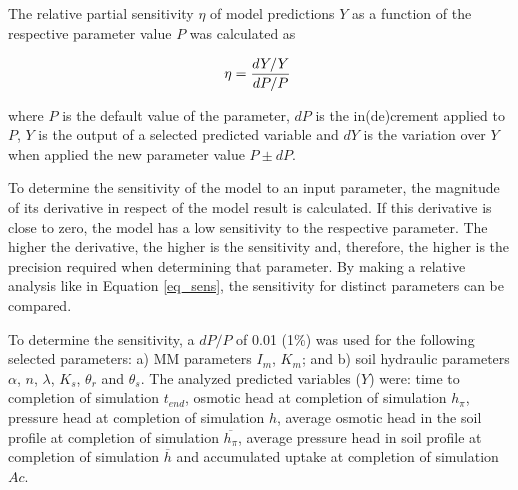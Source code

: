 The relative partial sensitivity $\eta$ \citep{quirijn_sens} of model predictions 
$Y$ as a function of the respective parameter value $P$ was calculated as

\begin{equation}
\label{eq_sens}
\eta = {dY/Y \over dP/P}\; 
\end{equation}

\noindent
where $P$ is the default value of the parameter, $dP$ is the in(de)crement applied to $P$, $Y$ is the output of a selected predicted variable and $dY$ is the variation over $Y$ when applied the new parameter value $P \pm dP$.

To determine the sensitivity of the model to an input parameter, the magnitude of its derivative in respect of the model result is calculated. 
If this derivative is close to zero, the model has a low sensitivity to the respective parameter. 
The higher the derivative, the higher is the sensitivity and, therefore, the higher is the precision required when determining that parameter. 
By making a relative analysis like in Equation \ref{eq_sens}, the sensitivity for distinct parameters can be compared. 

To determine the sensitivity, a $dP/P$ of 0.01 (1\%) was used for the following selected parameters: 
a) MM parameters $I_m$, $K_m$; and  
b) soil hydraulic parameters $\alpha$, $n$, $\lambda$, $K_s$, $\theta_r$ and $\theta_s$.
The analyzed predicted variables ($Y$) were: time to completion of simulation $t_{end}$, osmotic head at completion of simulation $h_{\pi}$, pressure head at completion of simulation $h$, average osmotic head in the soil profile at completion of simulation $\overline{h_{\pi}}$, average pressure head in soil profile at completion of simulation $\overline{h}$ and accumulated uptake at completion of simulation $Ac$.

